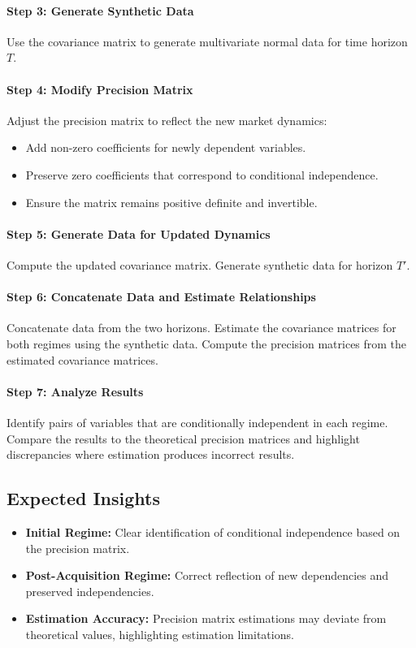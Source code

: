 \documentclass{article}
\begin{document}
\paragraph{Step 3: Generate Synthetic Data}
Use the covariance matrix to generate multivariate normal data for time horizon $T$.

\paragraph{Step 4: Modify Precision Matrix}
Adjust the precision matrix to reflect the new market dynamics:
\begin{itemize}
    \item Add non-zero coefficients for newly dependent variables.
    \item Preserve zero coefficients that correspond to conditional independence.
    \item Ensure the matrix remains positive definite and invertible.
\end{itemize}

\paragraph{Step 5: Generate Data for Updated Dynamics}
Compute the updated covariance matrix. Generate synthetic data for horizon $T'$.

\paragraph{Step 6: Concatenate Data and Estimate Relationships}
Concatenate data from the two horizons. Estimate the covariance matrices for both regimes using the synthetic data. Compute the precision matrices from the estimated covariance matrices.

\paragraph{Step 7: Analyze Results}
Identify pairs of variables that are conditionally independent in each regime. Compare the results to the theoretical precision matrices and highlight discrepancies where estimation produces incorrect results.

\subsection{Expected Insights}
\label{subsec:expected_insights}

\begin{itemize}
    \item \textbf{Initial Regime:} Clear identification of conditional independence based on the precision matrix.
    \item \textbf{Post-Acquisition Regime:} Correct reflection of new dependencies and preserved independencies.
    \item \textbf{Estimation Accuracy:} Precision matrix estimations may deviate from theoretical values, highlighting estimation limitations.
\end{itemize}
\end{document}
